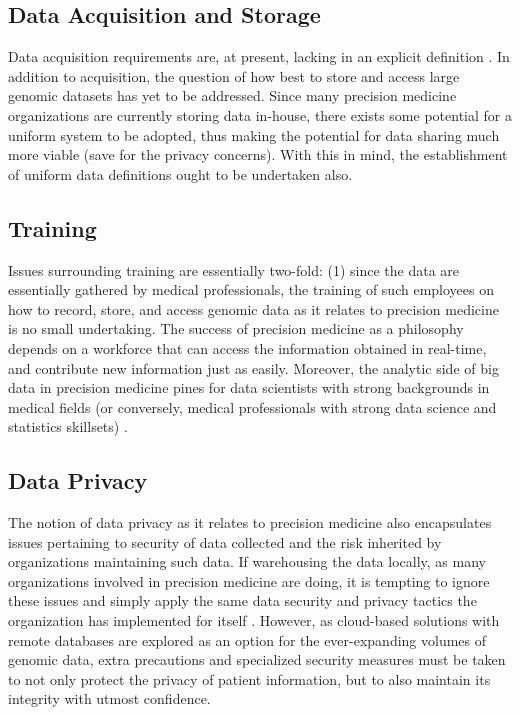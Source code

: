 \subsection{Data Acquisition and Storage}

Data acquisition requirements are, at present, lacking in an explicit definition \cite{ehealth2017}. In addition to acquisition, the question of how best to store and access large genomic datasets has yet to be addressed. Since many precision medicine organizations are currently storing data in-house, there exists some potential for a uniform system to be adopted, thus making the potential for data sharing much more viable (save for the privacy concerns). With this in mind, the establishment of uniform data definitions ought to be undertaken also.

\subsection{Training}

Issues surrounding training are essentially two-fold: (1) since the data are essentially gathered by medical professionals, the training of such employees on how to record, store, and access genomic data as it relates to precision medicine is no small undertaking. The success of precision medicine as a philosophy depends on a workforce that can access the information obtained in real-time, and contribute new information just as easily. Moreover, the analytic side of big data in precision medicine pines for data scientists with strong backgrounds in medical fields (or conversely, medical professionals with strong data science and statistics skillsets) \cite{He2017}.

\subsection{Data Privacy}

The notion of data privacy as it relates to precision medicine also encapsulates issues pertaining to security of data collected and the risk inherited by organizations maintaining such data. If warehousing the data locally, as many organizations involved in precision medicine are doing, it is tempting to ignore these issues and simply apply the same data security and privacy tactics the organization has implemented for itself \cite{ehealth2017} \cite{He2017}. However, as cloud-based solutions with remote databases are explored as an option for the ever-expanding volumes of genomic data, extra precautions and specialized security measures must be taken to not only protect the privacy of patient information, but to also maintain its integrity with utmost confidence.

